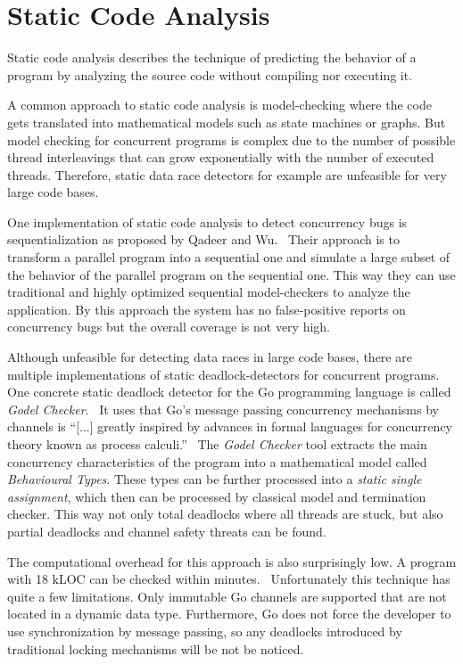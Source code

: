 \documentclass[conference]{IEEEtran}
\begin{document}
\section{Static Code Analysis}
\label{sct:static}

Static code analysis describes the technique of predicting the behavior of a program by analyzing the source code without compiling nor executing it.

A common approach to static code analysis is model-checking where the code gets translated into mathematical models such as state machines or graphs.
But model checking for concurrent programs is complex due to the number of possible thread interleavings that can grow exponentially with the number of executed threads.
Therefore, static data race detectors for example are unfeasible for very large code bases.~\cite{serebry2009threadsanitizer}

One implementation of static code analysis to detect concurrency bugs is sequentialization as proposed by Qadeer and Wu.~\cite{qadeer2004kiss}
Their approach is to transform a parallel program into a sequential one and simulate a large subset of the behavior of the parallel program on the sequential one.
This way they can use traditional and highly optimized sequential model-checkers to analyze the application.
By this approach the system has no false-positive reports on concurrency bugs but the overall coverage is not very high.

Although unfeasible for detecting data races in large code bases, there are multiple implementations of static deadlock-detectors for concurrent programs.
One concrete static deadlock detector for the Go programming language is called \emph{Godel Checker}.~\cite{godelChecker}
It uses that Go's message passing concurrency mechanisms by channels is ``[...] greatly inspired by advances in formal languages for concurrency theory known as process calculi.''~\cite{lange2018verification}
The \emph{Godel Checker} tool extracts the main concurrency characteristics of the program into a mathematical model called \emph{Behavioural Types}.
These types can be further processed into a \emph{static single assignment}, which then can be processed by classical model and termination checker.
This way not only total deadlocks where all threads are stuck, but also partial deadlocks and channel safety threats can be found.

The computational overhead for this approach is also surprisingly low.
A program with 18 kLOC can be checked within minutes.~\cite{lange2018verification}
Unfortunately this technique has quite a few limitations.
Only immutable Go channels are supported that are not located in a dynamic data type.
Furthermore, Go does not force the developer to use synchronization by message passing, so any deadlocks introduced by traditional locking mechanisms will be not be noticed.
\end{document}
